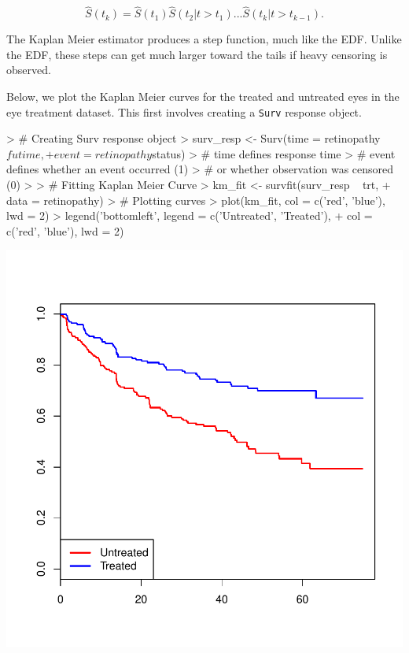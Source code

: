 \documentclass[a4paper]{article}
\begin{document}
    \[
    \hat S(t_k) = \hat S(t_1) \hat S(t_2| t > t_1) ... \hat S(t_k| t > t_{k-1}).
    \]
    
    The Kaplan Meier estimator produces a step function, much like the EDF. Unlike the EDF, these steps can get much larger toward the tails if heavy censoring is observed. 
    
    Below, we plot the Kaplan Meier curves for the treated and untreated eyes in the eye treatment dataset. This first involves creating a \texttt{Surv} response object. 
    
\begin{Schunk}
\begin{Sinput}
> # Creating Surv response object
> surv_resp <- Surv(time = retinopathy$futime,
+                     event = retinopathy$status)
> # time defines response time
> # event defines whether an event occurred (1)
> # or whether observation was censored (0)
> 
> # Fitting Kaplan Meier Curve
> km_fit <- survfit(surv_resp ~ trt, 
+                   data = retinopathy)
> # Plotting curves
> plot(km_fit, col = c('red', 'blue'), lwd = 2)
> legend('bottomleft', legend = c('Untreated', 'Treated'),
+        col = c('red', 'blue'), lwd = 2)
\end{Sinput}
\end{Schunk}
\includegraphics{StatisticalBackground-003}
\end{document}
